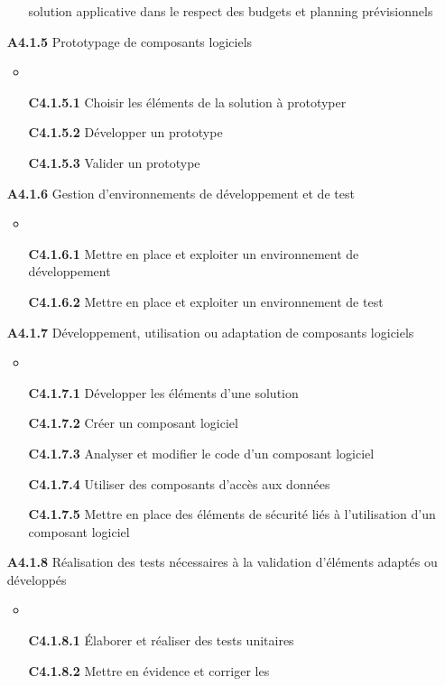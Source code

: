 \documentclass[12pt,a4paper,oneside,titlepage,final]{article}
\begin{document}
\begin{enumerate}
\begin{itemize}
    solution applicative dans le respect des budgets et planning
    prévisionnels
  \end{itemize}
  \item [\textbf{A4.1.5}] Prototypage de composants logiciels
  \begin{itemize}
    \item \item [\textbf{C4.1.5.1}] Choisir les éléments de la
    solution à prototyper
    \item [\textbf{C4.1.5.2}] Développer un prototype
    \item [\textbf{C4.1.5.3}] Valider un prototype
  \end{itemize}
  \item [\textbf{A4.1.6}] Gestion d'environnements de développement et
  de test
  \begin{itemize}
    \item \item [\textbf{C4.1.6.1}] Mettre en place et exploiter un
    environnement de développement
    \item [\textbf{C4.1.6.2}] Mettre en place et exploiter un
    environnement de test
  \end{itemize}
  \item [\textbf{A4.1.7}] Développement, utilisation ou adaptation de
  composants logiciels
  \begin{itemize}
    \item \item [\textbf{C4.1.7.1}] Développer les éléments d'une
    solution
    \item [\textbf{C4.1.7.2}] Créer un composant logiciel
    \item [\textbf{C4.1.7.3}] Analyser et modifier le code d'un
    composant logiciel
    \item [\textbf{C4.1.7.4}] Utiliser des composants d'accès aux
    données
    \item [\textbf{C4.1.7.5}] Mettre en place des éléments de sécurité
    liés à l'utilisation d'un composant logiciel
  \end{itemize}
  \item [\textbf{A4.1.8}] Réalisation des tests nécessaires à la
  validation d'éléments adaptés ou développés
  \begin{itemize}
    \item \item [\textbf{C4.1.8.1}] Élaborer et réaliser des tests
    unitaires
    \item [\textbf{C4.1.8.2}] Mettre en évidence et corriger les

\end{itemize}
\end{enumerate}
\end{document}
